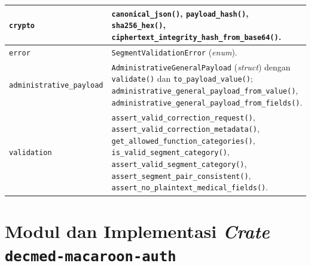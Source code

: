 \documentclass[bahasa, 12pt, a4paper, onecolumn, oneside, final]{report}
\begin{document}
\begin{longtable}{|>{\raggedright\arraybackslash}p{}|>{\raggedright\arraybackslash}p{}|}
	\texttt{crypto}
	               & \texttt{canonical\_json()}, \texttt{payload\_hash()}, \texttt{sha256\_hex()}, \texttt{ciphertext\_integrity\_hash\_from\_base64()}.
	\\ \hline

	\texttt{error}
	               & \texttt{SegmentValidationError} (\textit{enum}).
	\\ \hline

	\texttt{administrative\newline \_payload}
	               & \texttt{AdministrativeGeneralPayload} (\textit{struct}) dengan \texttt{validate()} dan \texttt{to\_payload\_value()}; \texttt{administrative\_general\_payload\_from\_value()}, \texttt{administrative\_general\_payload\_from\_fields()}.
	\\ \hline

	\texttt{validation}
	               & \texttt{assert\_valid\_correction\_request()}, \texttt{assert\_valid\_correction\_metadata()}, \texttt{get\_allowed\_function\_categories()}, \texttt{is\_valid\_segment\_category()}, \texttt{assert\_valid\_segment\_category()}, \texttt{assert\_segment\_pair\_consistent()}, \texttt{assert\_no\_plaintext\_medical\_fields()}.
	\\ \hline
\end{longtable}
\endgroup
\chapter{Modul dan Implementasi \textit{Crate} \texttt{decmed-macaroon-auth}}
\label{lampiran:implementasi-crate-decmed-macaroon-auth}
\end{document}
